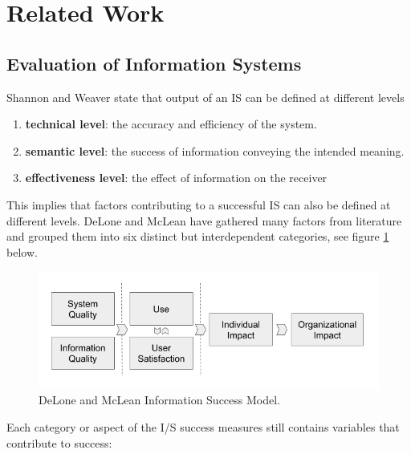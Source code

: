 \section{Related Work}



\subsection{Evaluation of Information Systems}
Shannon and Weaver \cite{shannon_weaver} state that output of an IS can be defined at different levels
\begin{enumerate}
\item \textbf{technical level}: the accuracy and efficiency of the system.
\item \textbf{semantic level}: the success of information conveying the intended meaning.
\item \textbf{effectiveness level}: the effect of information on the receiver 
\end{enumerate}

This implies that factors contributing to a successful IS can also be defined at different levels. DeLone and McLean\cite{delone_mclean:1, delone_mclean:2} have gathered many factors from literature and grouped them into six distinct but interdependent categories, see figure \ref{fig:success_model} below.

\begin{figure}[h]
\includegraphics[width=1\linewidth]{images/dm_is_success_model.png}
\caption{DeLone and McLean Information Success Model.}
\label{fig:success_model}
\end{figure}

Each category or aspect of the I/S success measures still contains variables that contribute to success:

